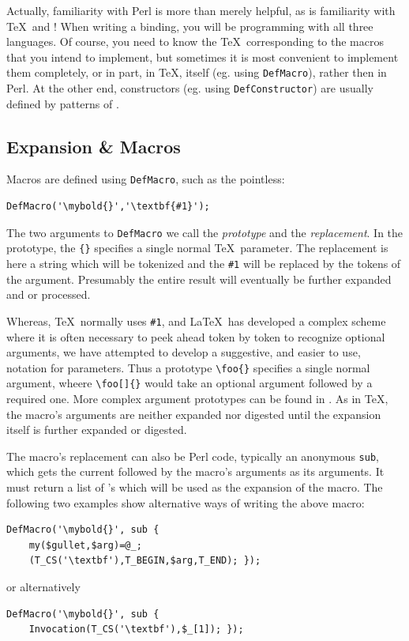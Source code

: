 \documentclass{book}
\newcommand{\ltxcode}{\lstinline[style=latexml]}
\begin{document}
Actually, familiarity with Perl is more than merely helpful, as is familiarity
with \TeX\ and \XML! When writing a binding, you will be programming with all
three languages.  Of course, you need to know the \TeX\ corresponding to
the macros that you intend to implement, but sometimes it is most convenient
to implement them completely, or in part, in \TeX, itself (eg. using \ltxcode|DefMacro|),
rather then in Perl. At the other end, constructors (eg. using \ltxcode|DefConstructor|)
are usually defined by patterns of \XML.

\subsection[Expansion]{Expansion \& Macros}\label{customization.latexml.expansion}
Macros are defined using \texttt{DefMacro}, such as the pointless:
\begin{lstlisting}[style=latexml]
  DefMacro('\mybold{}','\textbf{#1}');
\end{lstlisting}
The two arguments to \texttt{DefMacro} we call
the \emph{prototype} and the \emph{replacement}.
In the prototype, the \verb|{}| specifies a single normal \TeX\ parameter.
The replacement is here a string which will
be tokenized and the \verb|#1| will be replaced by the
tokens of the argument. Presumably the entire result will
eventually be further expanded and or processed.

Whereas, \TeX\ normally uses \verb|#1|, and \LaTeX\ has developed
a complex scheme where it is often necessary to peek ahead token
by token to recognize optional arguments, we have attempted
to develop a suggestive, and easier to use, notation for parameters.
Thus a prototype \verb|\foo{}| specifies a single normal argument,
wheere \verb|\foo[]{}| would take an optional argument followed
by a required one.  More complex argument prototypes can be
found in .
As in \TeX, the macro's arguments are neither expanded
nor digested until the expansion itself is further
expanded or digested.

The macro's replacement can also be Perl code, typically an
anonymous \texttt{sub}, which gets the current 
followed by the macro's arguments as its arguments.  It must
return a list of 's which will be used as the
expansion of the macro.  The following two examples show
alternative ways of writing the above macro:
\begin{lstlisting}[style=latexml]
  DefMacro('\mybold{}', sub {
    my($gullet,$arg)=@_;
    (T_CS('\textbf'),T_BEGIN,$arg,T_END); });
\end{lstlisting}
or alternatively
\begin{lstlisting}[style=latexml]
  DefMacro('\mybold{}', sub {
    Invocation(T_CS('\textbf'),$_[1]); });
\end{lstlisting}
\end{document}
